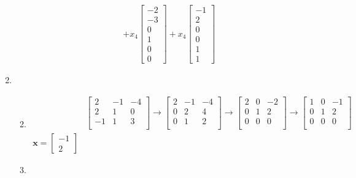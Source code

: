 \documentclass[letterpaper]{article}
\begin{document}
\begin{enumerate}
\begin{enumerate}
\begin{align*}
    +x_4\left[\begin{array}{c}-2\\-3\\0\\1\\0\\0\end{array}\right]
    +x_4\left[\begin{array}{c}-1\\2\\0\\0\\1\\1\end{array}\right]
  \end{align*}
  \end{enumerate}
\item
  \begin{enumerate}
  \setcounter{enumii}{1}
  \item
  \begin{align*}
    &
    \left[\begin{array}{rr|r}
      2&-1&-4\\
      2&1&0\\
      -1&1&3\\
    \end{array}\right]
    \to
    \left[\begin{array}{rr|r}
      2&-1&-4\\
      0&2&4\\
      0&1&2\\
    \end{array}\right]
    \to
    \left[\begin{array}{rr|r}
      2&0&-2\\
      0&1&2\\
      0&0&0\\
    \end{array}\right]
    \to
    \left[\begin{array}{rr|r}
      1&0&-1\\
      0&1&2\\
      0&0&0\\
    \end{array}\right]\\
    \mathbf{x}=\left[\begin{array}{r}-1\\2\end{array}\right]
  \end{align*}
  \setcounter{enumii}{3}
  \item

\end{enumerate}
\end{enumerate}
\end{document}
